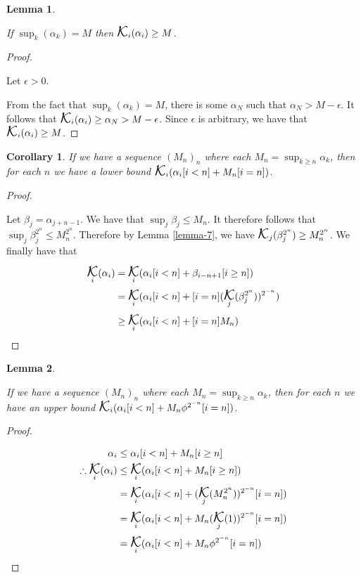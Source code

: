 \documentclass[
]{article}
\DeclareMathOperator*{\kap}{\text{\Large{$\mathcal K$}}}
\theoremstyle{theorem}
\theoremstyle{lemma}
\newtheorem{lemma}{Lemma}
\theoremstyle{corollary}
\newtheorem{corollary}{Corollary}[lemma]
\theoremstyle{remark}
\theoremstyle{definition}
\begin{document}
\begin{lemma}
\hypertarget{lemma-7}{%
\label{lemma-7}}


If \(\sup_k({\alpha_k}) = M\) then \(\kap_i(\alpha_i) \geq M\).

\end{lemma}
\begin{proof}

\hypertarget{proof-7}{%
\label{proof-7}}
Let \(\epsilon > 0\).

From the fact that \(\sup_k({\alpha_k}) = M\), there is some \(\alpha_N\) such that \(\alpha_N > M - \epsilon\). It follows that \(\kap_i(\alpha_i) \geq \alpha_N > M - \epsilon\). Since \(\epsilon\) is arbitrary, we have that \(\kap_i(\alpha_i) \geq M\).

\end{proof}
\begin{corollary}
\label{corollary-7.1}
If we have a sequence \((M_n)_n\) where each \(M_n = \sup_{k \geq n} \alpha_k\), then for each \(n\) we have a lower bound \(\kap_i(\alpha_i[i < n] + M_n[i = n])\).
\end{corollary}
\begin{proof}

\hypertarget{proof-8}{%
\label{proof-8}}
Let \(\beta_j = \alpha_{j+n-1}\). We have that \(\sup_j\beta_j \leq M_n\). It therefore follows that \(\sup_j\beta_j^{2^n} \leq M_n^{2^{n}}\). Therefore by Lemma \ref{lemma-7}, we have \(\kap_j(\beta_j^{2^n}) \geq M_n^{2^n}\). We finally have that \[\begin{aligned}
\kap_i(\alpha_i) &= \kap_i(\alpha_i[i < n] + \beta_{i - n + 1}[i \geq n])\\
&=\kap_i(\alpha_i[i < n] + [i = n](\kap_j(\beta_j^{2^n}))^{2^{-n}})\\
&\geq \kap_i(\alpha_i[i < n] + [i = n]M_n)\\
\end{aligned}\] \end{proof}
\begin{lemma}
\hypertarget{lemma-8}{%
\label{lemma-8}}


If we have a sequence \((M_n)_n\) where each \(M_n = \sup_{k \geq n} \alpha_k\), then for each \(n\) we have an upper bound \(\kap_i(\alpha_i[i < n] + M_n\phi^{2^{-n}}[i = n])\).

\end{lemma}
\begin{proof}

\hypertarget{proof-9}{%
\label{proof-9}}
\[\begin{aligned}
\alpha_i &\leq \alpha_i[i < n] + M_n[i \geq n] \\
\therefore \kap_i(\alpha_i) &\leq \kap_i(\alpha_i[i < n] + M_n[i \geq n]) \\
&= \kap_i(\alpha_i[i < n] + (\kap_j(M_n^{2^n}))^{2^{-n}}[i = n])\\
&= \kap_i(\alpha_i[i < n] + M_n(\kap_j(1))^{2^{-n}}[i = n])\\
&= \kap_i(\alpha_i[i < n] + M_n\phi^{2^{-n}}[i=n])\\
\end{aligned}\]

\end{proof}
\end{document}
